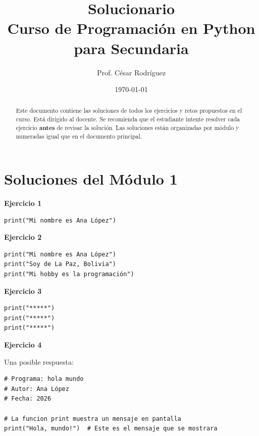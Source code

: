 \documentclass[12pt,a4paper]{article}
\title{\textbf{Solucionario}\\[6pt]
\large Curso de Programación en Python para Secundaria}
\author{Prof. César Rodríguez}
\date{\today}
\begin{document}
\maketitle

\begin{abstract}
\noindent Este documento contiene las soluciones de todos los ejercicios y retos propuestos en el curso. Está dirigido al docente. Se recomienda que el estudiante intente resolver cada ejercicio \textbf{antes} de revisar la solución. Las soluciones están organizadas por módulo y numeradas igual que en el documento principal.
\end{abstract}

\tableofcontents
\newpage

\section{Soluciones del Módulo 1}

\begin{cajaSolucion}
\textbf{Ejercicio 1}
\begin{lstlisting}[style=pythonStyle]
print("Mi nombre es Ana López")
\end{lstlisting}
\end{cajaSolucion}

\begin{cajaSolucion}
\textbf{Ejercicio 2}
\begin{lstlisting}[style=pythonStyle]
print("Mi nombre es Ana López")
print("Soy de La Paz, Bolivia")
print("Mi hobby es la programación")
\end{lstlisting}
\end{cajaSolucion}

\begin{cajaSolucion}
\textbf{Ejercicio 3}
\begin{lstlisting}[style=pythonStyle]
print("*****")
print("*****")
print("*****")
\end{lstlisting}
\end{cajaSolucion}

\begin{cajaSolucion}
\textbf{Ejercicio 4}

Una posible respuesta:
\begin{lstlisting}[style=pythonStyle]
# Programa: hola mundo
# Autor: Ana López
# Fecha: 2026

# La funcion print muestra un mensaje en pantalla
print("Hola, mundo!")  # Este es el mensaje que se mostrara
\end{lstlisting}
\end{cajaSolucion}
\end{document}
